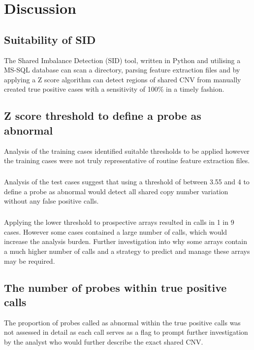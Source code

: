 \chapter{Discussion}\label{ch:Discussion} 
\section{Suitability of SID}
The Shared Imbalance Detection (SID) tool, written in Python and utilising a MS-SQL database can scan a directory, parsing feature extraction files and by applying a Z score algorithm can detect regions of shared CNV from manually created true positive cases with a sensitivity of 100\% in a timely fashion.


\section{Z score threshold to define a probe as abnormal}
Analysis of the training cases identified suitable thresholds to be applied however the training cases were not truly representative of routine feature extraction files.
\paragraph*{}
Analysis of the test cases suggest that using a threshold of between 3.55 and 4 to define a probe as abnormal would detect all shared copy number variation without any false positive calls. 

\paragraph*{}
Applying the lower threshold to prospective arrays resulted in calls in 1 in 9 cases. However some cases contained a large number of calls, which would increase the analysis burden. Further investigation into why some arrays contain a much higher number of calls and a strategy to predict and manage these arrays may be required.

\section{The number of probes within true positive calls}
The proportion of probes called as abnormal within the true positive calls was not assessed in detail as each call serves as a flag to prompt further investigation by the analyst who would further describe the exact shared CNV.
